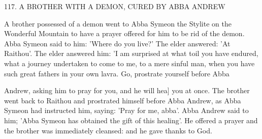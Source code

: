 117. A BROTHER WITH A DEMON,
CURED BY ABBA ANDREW

A brother possessed of a demon went to Abba Symeon the Stylite
on the Wonderful Mountain to have a prayer offered for him to be
rid of the demon. Abba Symeon said to him: 'Where do you live?'
The elder answered: 'At Raithou'. The elder answered him: 'I am
surprised at what toil you have endured, what a journey undertaken
to come to me, to a mere sinful man, when you have such great
fathers in your own lavra. Go, prostrate yourself before Abba

Andrew, asking him to pray for you, and he will hea] you at once.
The brother went back to Raithou and prostrated himself before
Abba Andrew, as Abba Symeon had instructed him, saying: 'Pray
for me, abba'. Abba Andrew said to him; 'Abba Symeon has
obtained the gift of this healing'. He offered a prayer and the
brother was immediately cleansed: and he gave thanks to God.

